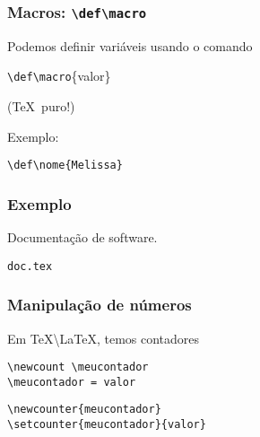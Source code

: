\documentclass{beamer}
\newcommand{\code}[1]{\texttt{#1}}
\begin{document}
\begin{frame}
   \frametitle{Macros: \code{\textbackslash def\textbackslash macro}}
   Podemos definir variáveis usando o comando
   \begin{center}
      \begin{block}{}
        \begin{center}
          \code{\textbackslash def\textbackslash macro}\{valor\}
        \end{center}
      \end{block}
   \end{center}
   (\TeX\ puro!)

   Exemplo:
   \begin{center}
     \code{\textbackslash def\textbackslash nome\{Melissa\}}
   \end{center}
 \end{frame}
\begin{frame}
   \frametitle{Exemplo}
   Documentação de software.
   \begin{center}
      \begin{block}{}
         \begin{center}
            \code{doc.tex}
         \end{center}
      \end{block}
   \end{center}
\end{frame}
\begin{frame}
  \frametitle{Manipulação de números}
  Em \TeX\textbackslash \LaTeX, temos \alert{contadores}
  \begin{center}
     \begin{block}{}
        \begin{center}
           \code{\textbackslash newcount \textbackslash meucontador}\\
           \code{\textbackslash meucontador = valor}
        \end{center}
     \end{block}
  \end{center}
  \begin{center}
    \begin{block}{}
      \begin{center}
        \code{\textbackslash newcounter\{meucontador\}}\\
        \code{\textbackslash setcounter\{meucontador\}\{valor\}}
      \end{center}
    \end{block}
  \end{center}
\end{frame}
\end{document}
